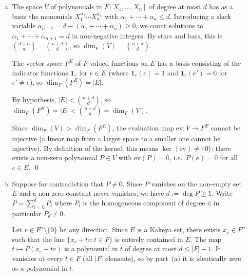 \documentclass[12pt]{article}
\begin{document}
\begin{enumerate}[(a)]
  Let $E = \{e_1, e_2, \ldots, e_k\}$ with $k = |E| \leq d$.

  Construct:
  \[
    P(X) \;=\; \prod_{i=1}^{k}(X - e_i).
  \]
  This polynomial is non-zero (it has leading coefficient $1$),
  has degree exactly $k \leq d$, and satisfies $P(e_i) = 0$ for every
  $e_i \in E$.  \qed

  \item

  The space $V$ of polynomials in $F[X_1, \ldots, X_n]$ of degree at
  most $d$ has as a basis the monomials
  $X_1^{\alpha_1} \cdots X_n^{\alpha_n}$ with
  $\alpha_1 + \cdots + \alpha_n \leq d$.
  Introducing a slack variable $\alpha_{n+1} = d -
  (\alpha_1 + \cdots + \alpha_n) \geq 0$, we count solutions to
  $\alpha_1 + \cdots + \alpha_{n+1} = d$ in non-negative integers.
  By stars and bars, this is $\binom{d+n}{n} = \binom{n+d}{d}$,
  so $\dim_F(V) = \binom{n+d}{d}$.

  The vector space $F^E$ of $F$-valued functions on $E$ has a basis
  consisting of the indicator functions $\mathbf{1}_e$ for $e \in E$
  (where $\mathbf{1}_e(e) = 1$ and $\mathbf{1}_e(e') = 0$ for
  $e' \neq e$), so $\dim_F(F^E) = |E|$.

  By hypothesis, $|E| < \binom{n+d}{d}$, so
  $\dim_F(F^E) = |E| < \binom{n+d}{d} = \dim_F(V)$.

  Since $\dim_F(V) > \dim_F(F^E)$, the evaluation map
  $\mathrm{ev} : V \to F^E$ cannot be injective (a linear map from a
  larger space to a smaller one cannot be injective).
  By definition of the kernel, this means $\ker(\mathrm{ev}) \neq
  \{0\}$: there exists a non-zero polynomial $P \in V$ with
  $\mathrm{ev}(P) = 0$, i.e.\ $P(e) = 0$ for all $e \in E$.  \qed

  \item

  Suppose for contradiction that $P \neq 0$.
  Since $P$ vanishes on the non-empty set $E$ and a non-zero constant
  never vanishes, we have $d := \deg P \geq 1$.
  Write $P = \sum_{i=0}^{d} P_i$ where $P_i$ is the homogeneous
  component of degree $i$; in particular $P_d \neq 0$.

  Let $v \in F^n \setminus \{0\}$ be any direction.
  Since $E$ is a Kakeya set, there exists $x_v \in F^n$ such that the
  line $\{x_v + tv : t \in F\}$ is entirely contained in $E$.
  The map $t \mapsto P(x_v + tv)$ is a polynomial in $t$ of degree at
  most $d \leq |F|-1$.  It vanishes at every $t \in F$ (all $|F|$
  elements), so by part~(a) it is identically zero as a polynomial in
  $t$.


\end{enumerate}
\end{document}
